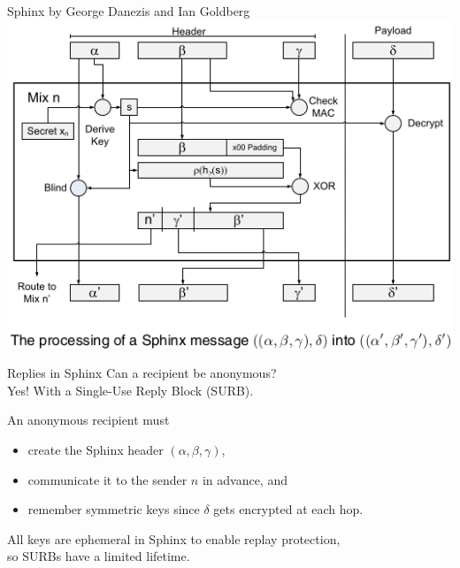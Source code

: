 \documentclass[fleqn,xcolor={usenames,dvipsnames}]{beamer}
\begin{document}
\begin{frame}{Sphinx by George Danezis and Ian Goldberg}
\includegraphics[width=\textwidth]{../pics/Sphinx-diagram}
\end{frame}


\begin{frame}[t]{Replies in Sphinx}
Can a recipient be anonymous? \\
Yes!  With a Single-Use Reply Block (SURB).

\medskip
An anonymous recipient must
\begin{itemize}
\item create the Sphinx header $(\alpha, \beta, \gamma)$, 
\item communicate it to the sender $n$ in advance, and 
\item remember symmetric keys since $\delta$ gets encrypted at each hop.
\end{itemize}

\bigskip
\bigskip
\pause
All keys are ephemeral in Sphinx to enable replay protection, \\
\hspace*{2pt} so SURBs have a limited lifetime.

\end{frame}
\end{document}
